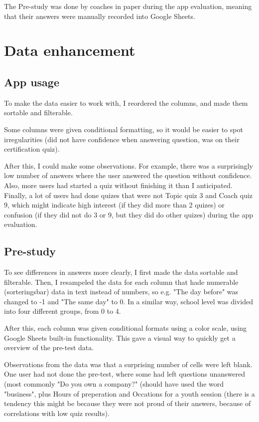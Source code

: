The Pre-study was done by coaches in paper during the app evaluation, meaning that their answers were manually recorded into Google Sheets.

\section{Data enhancement}

\subsection{App usage}
To make the data easier to work with, I reordered the columns, and made them sortable and filterable.

Some columns were given conditional formatting, so it would be easier to spot irregularities (did not have confidence when answering question, was on their certification quiz).


After this, I could make some observations. For example, there was a surprisingly low number of answers where the user answered the question without confidence. Also, more users had started a quiz without finishing it than I anticipated. Finally, a lot of users had done quizes that were not Topic quiz 3 and Coach quiz 9, which might indicate high interest (if they did more than 2 quizes) or confusion (if they did not do 3 or 9, but they did do other quizes) during the app evaluation.

\subsection{Pre-study}
To see differences in answers more clearly, I first made the data sortable and filterable. Then, I resampeled the data for each column that hade numerable (sorteringsbar) data in text instead of numbers, so e.g. "The day before" was changed to -1 and "The same day" to 0. In a similar way, school level was divided into four different groups, from 0 to 4.

After this, each column was given conditional formats using a color scale, using Google Sheets built-in functionality. This gave a visual way to quickly get a overview of the pre-test data.

Observations from the data was that a surprising number of cells were left blank. One user had not done the pre-test, where some had left questions unanswered (most commonly "Do you own a company?" (should have used the word "business", plus Hours of preperation and Occations for a youth session (there is a tendency this might be because they were not proud of their answers, because of correlations with low quiz results). 

